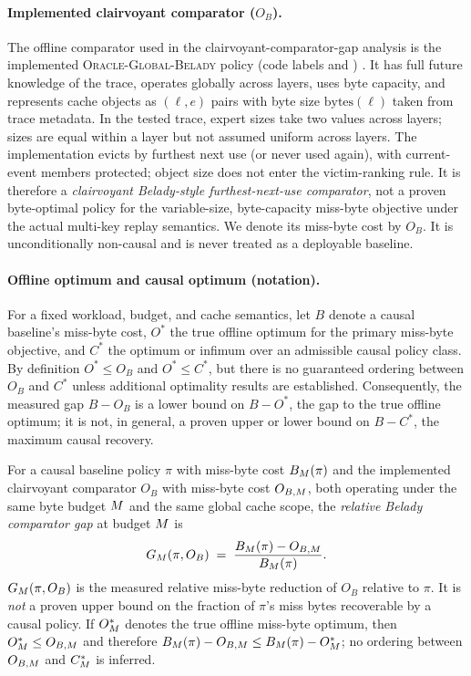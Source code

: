 \paragraph{Implemented clairvoyant comparator ($O_B$).} The offline
comparator used in the clairvoyant-comparator-gap analysis is the implemented \textsc{Oracle-Global-Belady}
policy (code labels  and )
\cite{belady1966replacement}. It has full future knowledge of the trace,
operates globally across layers, uses byte capacity, and represents cache
objects as $(\ell,e)$ pairs with byte size $\mathrm{bytes}(\ell)$ taken
from trace metadata. In the tested trace, expert sizes take two values
across layers; sizes are equal within a layer but not assumed uniform
across layers. The implementation evicts by furthest next use (or never
used again), with current-event members protected; object size does not
enter the victim-ranking rule. It is therefore a \emph{clairvoyant
Belady-style furthest-next-use comparator}, not a proven byte-optimal
policy for the variable-size, byte-capacity miss-byte objective under the
actual multi-key replay semantics. We denote its miss-byte cost by $O_B$.
It is unconditionally non-causal and is never treated as a deployable
baseline.

\paragraph{Offline optimum and causal optimum (notation).} For a fixed
workload, budget, and cache semantics, let $B$ denote a causal baseline's
miss-byte cost, $O^*$ the true offline optimum for the primary miss-byte
objective, and $C^*$ the optimum or infimum over an admissible causal
policy class. By definition $O^* \le O_B$ and $O^* \le C^*$, but there is
no guaranteed ordering between $O_B$ and $C^*$ unless additional
optimality results are established. Consequently, the measured gap
$B - O_B$ is a lower bound on $B - O^*$, the gap to the true offline
optimum; it is not, in general, a proven upper or lower bound on
$B - C^*$, the maximum causal recovery.

\begin{definition}
\label{def:comparator-gap}
For a causal baseline policy $\pi$ with miss-byte cost $B_M(\pi)$ and
the implemented clairvoyant comparator $O_B$ with miss-byte cost
$O_{B,M}$, both operating under the same byte budget $M$ and
the same global cache scope, the \emph{relative Belady comparator gap} at
budget $M$ is
\begin{equation}
G_{M}(\pi,O_B) \;=\; \frac{B_M(\pi) - O_{B,M}}{B_M(\pi)}.
\label{eq:comparator-gap}
\end{equation}
$G_M(\pi,O_B)$ is the measured relative miss-byte reduction of $O_B$
relative to $\pi$. It is \emph{not} a proven upper bound on the fraction of
$\pi$'s miss bytes recoverable by a causal policy. If $O^*_M$ denotes
the true offline miss-byte optimum, then $O^*_M \le O_{B,M}$ and
therefore $B_M(\pi)-O_{B,M} \le B_M(\pi)-O^*_M$; no
ordering between $O_{B,M}$ and $C^*_M$ is inferred.
\end{definition}

